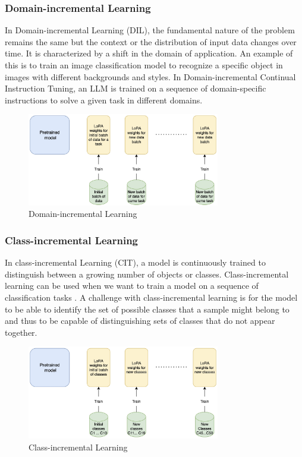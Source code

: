 \subsubsection{Domain-incremental Learning}
In Domain-incremental Learning (DIL), the fundamental nature of the problem remains the same but the context or the distribution of input data changes over time. It is characterized by a shift in the domain of application. An example of this is to train an image classification model to recognize a specific object in images with different backgrounds and styles. In Domain-incremental Continual Instruction Tuning, an LLM is trained on a sequence of domain-specific instructions to solve a given task in different domains. 
\begin{figure}[h]
    \centering
    \includegraphics[width=0.75\textwidth]{Figures/literature_review/domain_incremental_learning.jpeg} 
    \caption{Domain-incremental Learning}
    \label{fig:DomainIncrementalLearning}
\end{figure}

\subsubsection{Class-incremental Learning}
In class-incremental Learning (CIT), a model is continuously trained to distinguish between a growing number of objects or classes. Class-incremental learning can be used when we want to train a model on a sequence of classification tasks \cite{rebuffi2017icarl} \cite{von2019continual}. A challenge with class-incremental learning is for the model to be able to identify the set of possible classes that a sample might belong to and thus to be capable of distinguishing sets of classes that do not appear together. 
\begin{figure}[h]
    \centering
    \includegraphics[width=0.75\textwidth]{Figures/literature_review/class_incremental_learning.jpeg} 
    \caption{Class-incremental Learning}
    \label{fig:ClassIncrementalLearning}
\end{figure}

